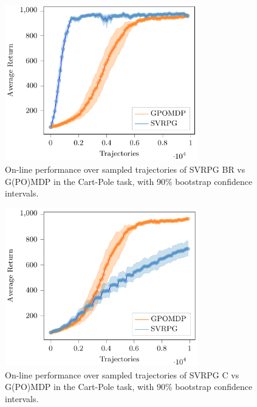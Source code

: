\begin{figure}[h]
	\begin{minipage}[h]{1\textwidth}
		\centering
		\includegraphics[width=0.75\textwidth]{Images/Experiments/cart_pole_GPOMDP_vs_SVRPG_B_reuse.pdf}
		\vspace{-0.1in}
		\caption{On-line performance over sampled trajectories of \acs{SVRPG} BR vs G(PO)MDP in the Cart-Pole task, with 90\% bootstrap confidence intervals.}
		\label{fig:cartpole2}
	\end{minipage}
	\vspace{-0.15in}
\end{figure}
\clearpage
\begin{figure}[h]
	\begin{minipage}[h]{1\textwidth}
		\centering
		\includegraphics[width=0.75\textwidth]{Images/Experiments/cart_pole_GPOMDP_vs_SVRPG_C.pdf}
		\vspace{-0.1in}
		\caption{On-line performance over sampled trajectories of \acs{SVRPG} C vs G(PO)MDP in the Cart-Pole task, with 90\% bootstrap confidence intervals.}
		\label{fig:cartpole3}
	\end{minipage}
	\vspace{-0.15in}
\end{figure}
